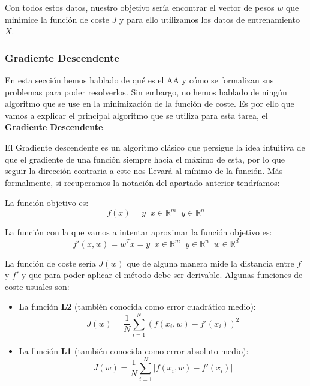             \noindent Con todos estos datos, nuestro objetivo sería encontrar el vector de pesos $w$ que minimice la función de coste $J$ y para ello utilizamos los datos de entrenamiento $X$.     
            
        \subsubsection{Gradiente Descendente}
            \noindent En esta sección hemos hablado de qué es el AA y cómo se formalizan sus problemas para poder resolverlos. Sin embargo, no hemos hablado de ningún algoritmo que se use en la minimización de la función de coste. Es por ello que vamos a explicar el principal algoritmo que se utiliza para esta tarea, el \textbf{Gradiente Descendente}. 
    
            \medskip
    
            \noindent El Gradiente descendente es un algoritmo clásico que persigue la idea intuitiva de que el gradiente de una función siempre  hacia el máximo de esta, por lo que seguir la dirección contraria a este nos llevará al mínimo de la función. Más formalmente, si recuperamos la notación del apartado anterior tendríamos: 
    
            \medskip
            
            \noindent La función objetivo es: 
            \begin{equation}
                f(x)=y \; \; x \in \mathbb{R}^m \; \; y \in \mathbb{R}^n
            \end{equation}
    
            \noindent La función con la que vamos a intentar aproximar la función objetivo es:
            \begin{equation}
                f'(x,w)=w^T x=y \; \; x \in \mathbb{R}^m \; \; y \in \mathbb{R}^n \; \; w \in \mathbb{R}^d 
            \end{equation}
    
            \noindent La función de coste sería $J(w)$ que de alguna manera mide la distancia entre $f$ y $f'$ y que para poder aplicar el método debe ser derivable. Algunas funciones de coste usuales son: 
    
            \begin{itemize}
                \item La función \textbf{L2} (también conocida como error cuadrático medio): 
                \begin{equation}
                    J(w)=\frac{1}{N} \sum_{i=1}^N(f(x_i,w)-f'(x_i))^2
                \end{equation}
                \item La función \textbf{L1} (también conocida como error absoluto medio): 
                \begin{equation}
                    J(w)=\frac{1}{N} \sum_{i=1}^N \left|f(x_i,w)-f'(x_i)\right|
                \end{equation}
            \end{itemize}
    
